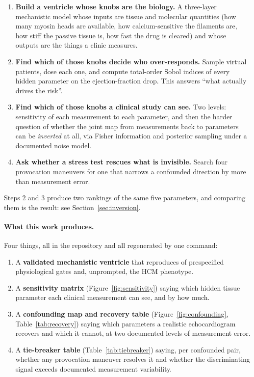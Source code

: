 \documentclass[11pt,a4paper]{article}
\begin{document}
\begin{enumerate}[nosep,leftmargin=1.4em]
  \item \textbf{Build a ventricle whose knobs are the biology.} A three-layer mechanistic
        model whose inputs are tissue and molecular quantities (how many myosin heads are
        available, how calcium-sensitive the filaments are, how stiff the passive tissue is,
        how fast the drug is cleared) and whose outputs are the things a clinic measures.
  \item \textbf{Find which of those knobs decide who over-responds.} Sample
        \nSampled{} virtual patients, dose each one, and compute total-order Sobol indices of
        every hidden parameter on the ejection-fraction drop. This answers ``what actually
        drives the risk''.
  \item \textbf{Find which of those knobs a clinical study can see.} Two levels: sensitivity
        of each measurement to each parameter, and then the harder question of whether the
        joint map from measurements back to parameters can be \emph{inverted} at all, via
        Fisher information and posterior sampling under a documented noise model.
  \item \textbf{Ask whether a stress test rescues what is invisible.} Search four provocation
        maneuvers for one that narrows a confounded direction by more than measurement error.
\end{enumerate}

\noindent Steps 2 and 3 produce two rankings of the same five parameters, and comparing them
is the result: see Section~\ref{sec:inversion}.

\paragraph{What this work produces.} Four things, all in the repository and all regenerated
by one command:

\begin{enumerate}[nosep,leftmargin=1.4em]
  \item A \textbf{validated mechanistic ventricle} that reproduces \nGatesPassed{} of
        \nGates{} prespecified physiological gates and, unprompted, the HCM phenotype.
  \item A \textbf{sensitivity matrix} (Figure~\ref{fig:sensitivity}) saying which hidden
        tissue parameter each clinical measurement can see, and by how much.
  \item A \textbf{confounding map and recovery table} (Figure~\ref{fig:confounding},
        Table~\ref{tab:recovery}) saying which parameters a realistic echocardiogram
        recovers and which it cannot, at two documented levels of measurement error.
  \item A \textbf{tie-breaker table} (Table~\ref{tab:tiebreaker}) saying, per confounded
        pair, whether any provocation maneuver resolves it and whether the discriminating
        signal exceeds documented measurement variability.
\end{enumerate}
\end{document}
